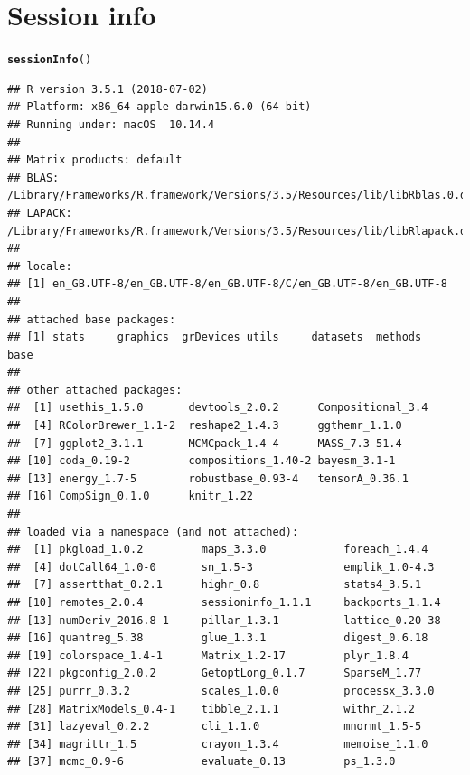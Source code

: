 \documentclass{article}\usepackage[]{graphicx}\usepackage[]{color}
\makeatletter
\newcommand{\hlstd}[1]{\textcolor[rgb]{0.345,0.345,0.345}{#1}}%
\newcommand{\hlkwd}[1]{\textcolor[rgb]{0.737,0.353,0.396}{\textbf{#1}}}%
\newenvironment{kframe}{%
 \def\at@end@of@kframe{}%
 \ifinner\ifhmode%
  \def\at@end@of@kframe{\end{minipage}}%
  \begin{minipage}{\columnwidth}%
 \fi\fi%
 \def\FrameCommand##1{\hskip\@totalleftmargin \hskip-\fboxsep
 \colorbox{shadecolor}{##1}\hskip-\fboxsep
     \hskip-\linewidth \hskip-\@totalleftmargin \hskip\columnwidth}%
 \MakeFramed {\advance\hsize-\width
   \@totalleftmargin\z@ \linewidth\hsize
   \@setminipage}}%
 {\par\unskip\endMakeFramed%
 \at@end@of@kframe}
\newenvironment{knitrout}{}{} %
\makeatother
\begin{document}
\clearpage

\clearpage
\printbibliography

\clearpage
\section{Session info}
\begin{knitrout}
\color{fgcolor}\begin{kframe}
\begin{alltt}
  \hlkwd{sessionInfo}\hlstd{()}
\end{alltt}
\begin{verbatim}
## R version 3.5.1 (2018-07-02)
## Platform: x86_64-apple-darwin15.6.0 (64-bit)
## Running under: macOS  10.14.4
## 
## Matrix products: default
## BLAS: /Library/Frameworks/R.framework/Versions/3.5/Resources/lib/libRblas.0.dylib
## LAPACK: /Library/Frameworks/R.framework/Versions/3.5/Resources/lib/libRlapack.dylib
## 
## locale:
## [1] en_GB.UTF-8/en_GB.UTF-8/en_GB.UTF-8/C/en_GB.UTF-8/en_GB.UTF-8
## 
## attached base packages:
## [1] stats     graphics  grDevices utils     datasets  methods   base     
## 
## other attached packages:
##  [1] usethis_1.5.0       devtools_2.0.2      Compositional_3.4  
##  [4] RColorBrewer_1.1-2  reshape2_1.4.3      ggthemr_1.1.0      
##  [7] ggplot2_3.1.1       MCMCpack_1.4-4      MASS_7.3-51.4      
## [10] coda_0.19-2         compositions_1.40-2 bayesm_3.1-1       
## [13] energy_1.7-5        robustbase_0.93-4   tensorA_0.36.1     
## [16] CompSign_0.1.0      knitr_1.22         
## 
## loaded via a namespace (and not attached):
##  [1] pkgload_1.0.2         maps_3.3.0            foreach_1.4.4        
##  [4] dotCall64_1.0-0       sn_1.5-3              emplik_1.0-4.3       
##  [7] assertthat_0.2.1      highr_0.8             stats4_3.5.1         
## [10] remotes_2.0.4         sessioninfo_1.1.1     backports_1.1.4      
## [13] numDeriv_2016.8-1     pillar_1.3.1          lattice_0.20-38      
## [16] quantreg_5.38         glue_1.3.1            digest_0.6.18        
## [19] colorspace_1.4-1      Matrix_1.2-17         plyr_1.8.4           
## [22] pkgconfig_2.0.2       GetoptLong_0.1.7      SparseM_1.77         
## [25] purrr_0.3.2           scales_1.0.0          processx_3.3.0       
## [28] MatrixModels_0.4-1    tibble_2.1.1          withr_2.1.2          
## [31] lazyeval_0.2.2        cli_1.1.0             mnormt_1.5-5         
## [34] magrittr_1.5          crayon_1.3.4          memoise_1.1.0        
## [37] mcmc_0.9-6            evaluate_0.13         ps_1.3.0             

\end{verbatim}
\end{kframe}
\end{knitrout}
\end{document}
